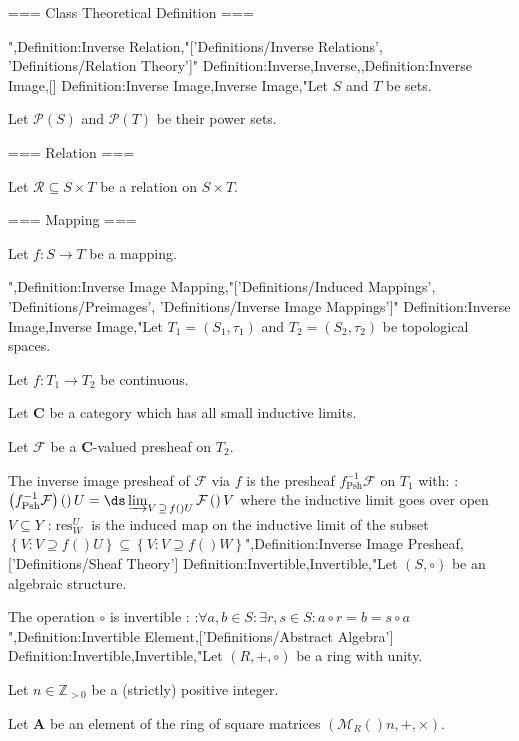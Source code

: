 === Class Theoretical Definition ===


",Definition:Inverse Relation,"['Definitions/Inverse Relations', 'Definitions/Relation Theory']"
Definition:Inverse,Inverse,,Definition:Inverse Image,[]
Definition:Inverse Image,Inverse Image,"Let $S$ and $T$ be sets.

Let $\mathcal P \left( S \right)$ and $\mathcal P \left( T \right)$ be their power sets.


=== Relation ===

Let $\mathcal R \subseteq S \times T$ be a relation on $S \times T$.



=== Mapping ===

Let $f: S \to T$ be a mapping.

",Definition:Inverse Image Mapping,"['Definitions/Induced Mappings', 'Definitions/Preimages', 'Definitions/Inverse Image Mappings']"
Definition:Inverse Image,Inverse Image,"Let $T_1 = \left( S_1, \tau_1 \right)$ and $T_2 = \left( S_2, \tau_2 \right)$ be topological spaces.

Let $f: T_1 \to T_2$ be continuous.

Let $\mathbf C$ be a category which has all small inductive limits.

Let $\mathcal F$ be a $\mathbf C$-valued presheaf on $T_2$.


The inverse image presheaf of $\mathcal F$ via $f$ is the presheaf $f^{-1}_{\operatorname {Psh} } \mathcal F$ on $T_1$ with:
:$\left( f^{-1}_{\operatorname{Psh} } \mathcal F \right)  \left(   \right)U = \ds \varinjlim_{V \mathop \supseteq f \left(   \right)U} \mathcal F \left(   \right)V$ where the inductive limit goes over open $V \subseteq Y$
:$\operatorname {res}^U_W$ is the induced map on the inductive limit of the subset $\left\lbrace V: V \supseteq f \left(   \right)U \right\rbrace \subseteq \left\lbrace V : V \supseteq f \left(   \right)W \right\rbrace$",Definition:Inverse Image Presheaf,['Definitions/Sheaf Theory']
Definition:Invertible,Invertible,"Let $\left({S, \circ}\right)$ be an algebraic structure.


The operation $\circ$ is invertible :
:$\forall a, b \in S: \exists r, s \in S: a \circ r = b = s \circ a$
",Definition:Invertible Element,['Definitions/Abstract Algebra']
Definition:Invertible,Invertible,"Let $\left( R, +, \circ \right)$ be a ring with unity.

Let $n \in \mathbb Z_{>0}$ be a (strictly) positive integer.

Let $\mathbf A$ be an element of the ring of square matrices $\left( \mathcal M_R \left(   \right)n, +, \times \right)$.


